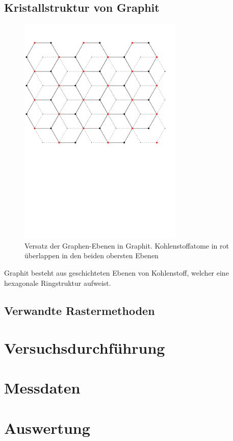 \documentclass[10pt, a4paper]{article}
\begin{document}
\subsection{Kristallstruktur von Graphit}
\begin{figure}[h]
  \centering
  \includegraphics[width=0.7\textwidth]{grafiken/graphit.pdf}
  \caption{Versatz der Graphen-Ebenen in Graphit. Kohlenstoffatome in rot überlappen in den beiden obersten Ebenen}
\end{figure}
Graphit besteht aus geschichteten Ebenen von Kohlenstoff, welcher eine hexagonale Ringstruktur aufweist. 

\subsection{Verwandte Rastermethoden}

\section{Versuchsdurchführung}

\section{Messdaten}

\section{Auswertung}
\end{document}
